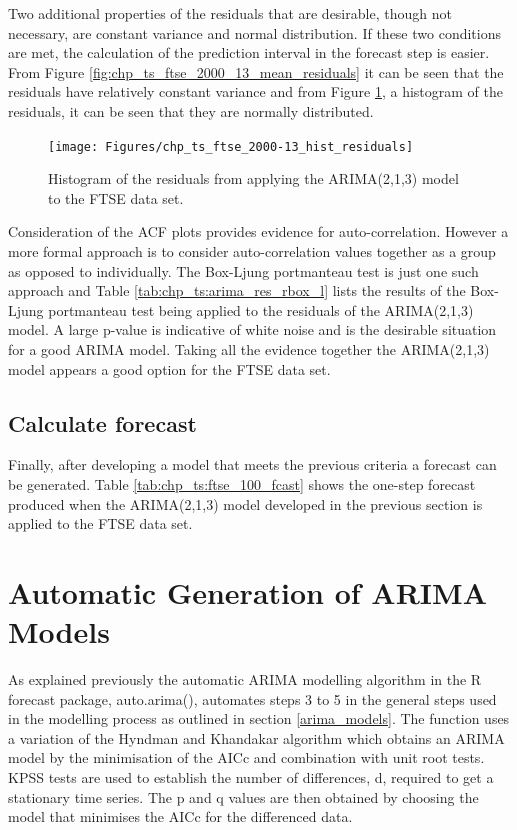 Two additional properties of the residuals that are desirable, though not necessary, are constant variance and normal distribution. If these two conditions are met, the calculation of the prediction interval in the forecast step is easier. From Figure \ref{fig:chp_ts_ftse_2000_13_mean_residuals} it can be seen that the residuals have relatively constant variance and from Figure \ref{fig:chp_ts_ftse_2000_13_hist_residuals}, a histogram of the residuals, it can be seen that they are normally distributed.

\begin{figure}[!tbh]
\centering
\texttt{[image: Figures/chp\_ts\_ftse\_2000-13\_hist\_residuals]}
\caption[FTSE 2000-13 - Histogram of residuals.]{Histogram of the residuals from applying the ARIMA(2,1,3) model to the FTSE data set.}
\label{fig:chp_ts_ftse_2000_13_hist_residuals}
\end{figure}

Consideration of the ACF plots provides evidence for auto-correlation. However a more formal approach is to consider auto-correlation values together as a group as opposed to individually. The Box-Ljung portmanteau test is just one such approach and Table \ref{tab:chp_ts:arima_res_rbox_l} lists the results of the Box-Ljung portmanteau test being applied to the residuals of the ARIMA(2,1,3) model. A large p-value is indicative of white noise and is the desirable situation for a good ARIMA model. Taking all the evidence together the ARIMA(2,1,3) model appears a good option for the FTSE data set.



\subsection{Calculate forecast}
Finally, after developing a model that meets the previous criteria a forecast can be generated. Table \ref{tab:chp_ts:ftse_100_fcast} shows the one-step forecast produced when the ARIMA(2,1,3) model developed in the previous section is applied to the FTSE data set.
 


\section{Automatic Generation of ARIMA Models}
As explained previously the automatic ARIMA modelling algorithm in the R forecast package, auto.arima(), automates steps 3 to 5 in the general steps used in the modelling process as outlined in section \ref{arima_models}. The function uses a variation of the Hyndman and Khandakar algorithm which obtains an ARIMA model by the minimisation of the AICc and combination with unit root tests. KPSS tests are used to establish the number of differences, d, required to get a stationary time series. The p and q values are then obtained by choosing the model that minimises the AICc for the differenced data. 

